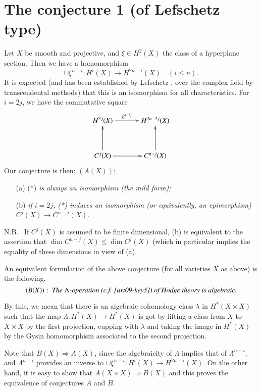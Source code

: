 \section{The conjecture 1 (of Lefschetz type)}\label{art09-sec3}

Let $X$ be smooth and projective, and $\xi\in H^{2}(X)$ the class of a hyperplane section. Then we have a homomorphism
\begin{equation*}
\cup \xi^{n-i}:H^{i}(X)\to H^{2n-i}(X)\quad (i\leq n).\tag{*}
\end{equation*}\pageoriginale
It is expected (and has been established by Lefschetz \cite{art09-key2}, \cite{art09-key5} over the complex field by transcendental methods) that this is an isomorphism for all characteristics. For $i=2j$, we have the commutative square
\[
\xymatrix@=1.2cm{
H^{2j}(X)\ar[r]^-{\xi^{n-2j}} & H^{2n-2j}(X)\\
C^{j}(X)\ar[u]\ar[r] & C^{n-j}(X)\ar[u]
}
\]
Our conjecture is then: $(A(X))$:
\begin{itemize}
\item[(a)] (*) {\em is always an isomorphism (the mild form);}

\item[(b)] {\em if $i=2j$, (*) induces an isomorphism (or equivalently, an epimorphism)} $C^{j}(X)\to C^{n-j}(X)$.
\end{itemize}

N.B.~ If $C^{j}(X)$ is assumed to be finite dimensional, (b) is equivalent to the assertion that $\dim C^{n-j}(X)\leq \dim C^{j}(X)$ (which in particular implies the equality of these dimensions in view of (a).

An equivalent formulation of the above conjecture (for all varieties $X$ as above) is the following.
$$
(B(X)): \text{~\em The $\Lambda$-operation (c.f. \cite{art09-key5}) of Hodge theory is algebraic.}
$$

By this, we mean that there is an algebraic cohomology class $\lambda$ in $H^{*}(X\times X)$ such that the map $\Lambda:H^{*}(X)\to H^{*}(X)$ is got by lifting a class from $X$ to $X\times X$ by the first projection, cupping with $\lambda$ and taking the image in $H^{*}(X)$ by the Gysin homomorphism associated to the second projection.

Note that $B(X)\Rightarrow A(X)$, since the algebraicity of $\Lambda$ implies that of $\Lambda^{n-i}$, and $\Lambda^{n-i}$ provides an inverse to $\cup \xi^{n-i}:H^{i}(X)\to H^{2n-i}(X)$. On the other hand, it is easy to show that $A(X\times X)\Rightarrow B(X)$ and this proves the equivalence of conjectures $A$ and $B$.

